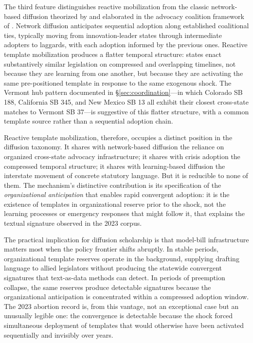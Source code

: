 The third feature distinguishes reactive mobilization from the classic network-based diffusion theorized by \textcite{ballaInterstateProfessionalAssociations2001} and elaborated in the advocacy coalition framework of \textcite{sabatier_weible_2007}. Network diffusion anticipates sequential adoption along established coalitional ties, typically moving from innovation-leader states through intermediate adopters to laggards, with each adoption informed by the previous ones. Reactive template mobilization produces a flatter temporal structure: states enact substantively similar legislation on compressed and overlapping timelines, not because they are learning from one another, but because they are activating the same pre-positioned template in response to the same exogenous shock. The Vermont hub pattern documented in \S\ref{sec:coordination}---in which Colorado SB 188, California SB 345, and New Mexico SB 13 all exhibit their closest cross-state matches to Vermont SB 37---is suggestive of this flatter structure, with a common template source rather than a sequential adoption chain.

Reactive template mobilization, therefore, occupies a distinct position in the diffusion taxonomy. It shares with network-based diffusion the reliance on organized cross-state advocacy infrastructure; it shares with crisis adoption the compressed temporal structure; it shares with learning-based diffusion the interstate movement of concrete statutory language. But it is reducible to none of them. The mechanism's distinctive contribution is its specification of the \emph{organizational anticipation} that enables rapid convergent adoption: it is the existence of templates in organizational reserve prior to the shock, not the learning processes or emergency responses that might follow it, that explains the textual signature observed in the 2023 corpus.

The practical implication for diffusion scholarship is that model-bill infrastructure matters most when the policy frontier shifts abruptly. In stable periods, organizational template reserves operate in the background, supplying drafting language to allied legislators without producing the statewide convergent signatures that text-as-data methods can detect. In periods of preemption collapse, the same reserves produce detectable signatures because the organizational anticipation is concentrated within a compressed adoption window. The 2023 abortion record is, from this vantage, not an exceptional case but an unusually legible one: the convergence is detectable because the shock forced simultaneous deployment of templates that would otherwise have been activated sequentially and invisibly over years.

